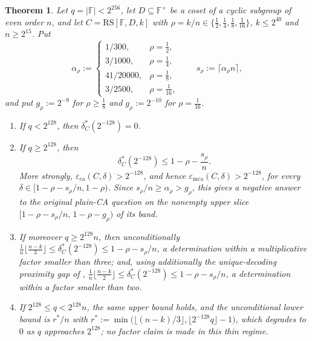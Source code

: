 \documentclass[11pt]{amsart}
\newtheorem{theorem}{Theorem}[section]
\theoremstyle{definition}
\theoremstyle{remark}
\newcommand{\F}{\mathbb{F}}
\newcommand{\RS}{\mathrm{RS}}
\newcommand{\eca}{\varepsilon_{\mathrm{ca}}}
\newcommand{\emca}{\varepsilon_{\mathrm{mca}}}
\begin{document}
\begin{theorem}\label{thm:main}
Let $q=|\F|<2^{256}$, let $D\subseteq\F^\times$ be a coset of a cyclic subgroup of even order $n$, and let $C=\RS[\F,D,k]$ with $\rho=k/n\in\{\tfrac12,\tfrac14,\tfrac18,\tfrac1{16}\}$, $k\le2^{40}$ and $n\ge2^{15}$. Put
\[
\alpha_\rho:=
\begin{cases}
1/300, & \rho=\tfrac12,\\
3/1000, & \rho=\tfrac14,\\
41/20000, & \rho=\tfrac18,\\
3/2500, & \rho=\tfrac1{16},
\end{cases}
\qquad s_\rho:=\lceil\alpha_\rho n\rceil,
\]
and put $g_\rho:=2^{-9}$ for $\rho\ge\tfrac18$ and $g_\rho:=2^{-10}$ for $\rho=\tfrac1{16}$.
\begin{enumerate}
\item If $q<2^{128}$, then $\delta^*_C(2^{-128})=0$.
\item If $q\ge2^{128}$, then
\[
\delta^*_C(2^{-128})\le 1-\rho-\frac{s_\rho}{n}.
\]
More strongly, $\eca(C,\delta)>2^{-128}$, and hence $\emca(C,\delta)>2^{-128}$, for every $\delta\in[1-\rho-s_\rho/n,1-\rho)$. Since $s_\rho/n\ge\alpha_\rho>g_\rho$, this gives a negative answer to the original plain-CA question on the nonempty upper slice $[1-\rho-s_\rho/n,\,1-\rho-g_\rho)$ of its band.
\item If moreover $q\ge2^{128}n$, then unconditionally
$\tfrac1n\bigl\lfloor\tfrac{n-k}3\bigr\rfloor\le\delta^*_C(2^{-128})\le1-\rho-s_\rho/n$,
a determination within a multiplicative factor smaller than three; and, using additionally the unique-decoding proximity gap of \cite{BCIKS20},
$\tfrac1n\bigl\lfloor\tfrac{n-k}2\bigr\rfloor\le\delta^*_C(2^{-128})\le1-\rho-s_\rho/n$,
a determination within a factor smaller than two.
\item If $2^{128}\le q<2^{128}n$, the same upper bound holds, and the unconditional lower bound is $r^*/n$ with $r^*:=\min\bigl(\lfloor(n-k)/3\rfloor,\lfloor2^{-128}q\rfloor-1\bigr)$, which degrades to $0$ as $q$ approaches $2^{128}$; no factor claim is made in this thin regime.
\end{enumerate}
\end{theorem}
\end{document}
